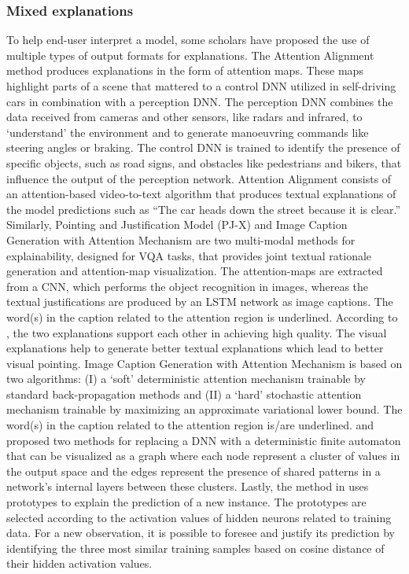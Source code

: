 \documentclass[final,1p,times]{elsarticle}
\begin{document}
\subsubsection{Mixed explanations}
To help end-user interpret a model, some scholars have proposed the use of multiple types of output formats for explanations.
The Attention Alignment method \cite{kim2018textual} produces explanations in the form of attention maps. These maps highlight parts of a scene that mattered to a control DNN utilized in self-driving cars in combination with a perception DNN. The perception DNN combines the data received from cameras and other sensors, like radars and infrared, to `understand' the environment and to generate manoeuvring commands like steering angles or braking. The control DNN is trained to identify the presence of specific objects, such as road signs, and obstacles like pedestrians and bikers, that influence the output of the perception network. Attention Alignment consists of an attention-based video-to-text algorithm that produces textual explanations of the model predictions such as ``The car heads down the street because it is clear.'' 
Similarly, Pointing and Justification Model (PJ-X) \cite{park2018multimodal} and Image Caption Generation with Attention Mechanism \cite{xuk2015show} are two multi-modal methods for explainability, designed for VQA tasks, that provides joint textual rationale generation and attention-map visualization. The attention-maps are extracted from a CNN, which performs the object recognition in images, whereas the textual justifications are produced by an LSTM network as image captions. The word(s) in the caption related to the attention region is underlined.
According to \cite{park2018multimodal}, the two explanations support each other in achieving high quality. The visual explanations help to generate better textual explanations which lead to better visual pointing.
Image Caption Generation with Attention Mechanism is based on two algorithms: (I) a `soft' deterministic attention mechanism trainable by standard back-propagation methods and (II) a `hard' stochastic attention mechanism trainable by maximizing an approximate variational lower bound. The word(s) in the caption related to the attention region is/are underlined.
\cite{mayr2018regular} and \cite{omlin1996extraction} proposed two methods for replacing a DNN with a deterministic finite automaton that can be visualized as a graph where each node represent a cluster of values in the output space and the edges represent the presence of shared patterns in a network's internal layers between these clusters.
Lastly, the method in \cite{tamajka2019transforming} uses prototypes to explain the prediction of a new instance. The prototypes are selected according to the activation values of hidden neurons related to training data. For a new observation, it is possible to foresee and justify its prediction by identifying the three most similar training samples based on cosine distance of their hidden activation values.\\ 
\end{document}
